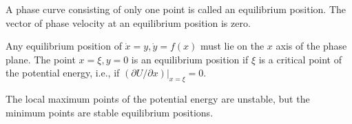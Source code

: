 A phase curve consisting of only one point is called an equilibrium position. The vector of phase velocity at an equilibrium position is zero.

Any equilibrium position of $\dot{x} = y, \dot{y} = f(x)$ must lie on the $x$ axis of the phase plane. The point $x = \xi, y = 0$ is an equilibrium position if $\xi$ is a critical point of the potential energy, i.e., if $(\partial U/\partial x)|_{x=\xi} = 0$.

The local maximum points of the potential energy are unstable, but the minimum points are stable equilibrium positions.
